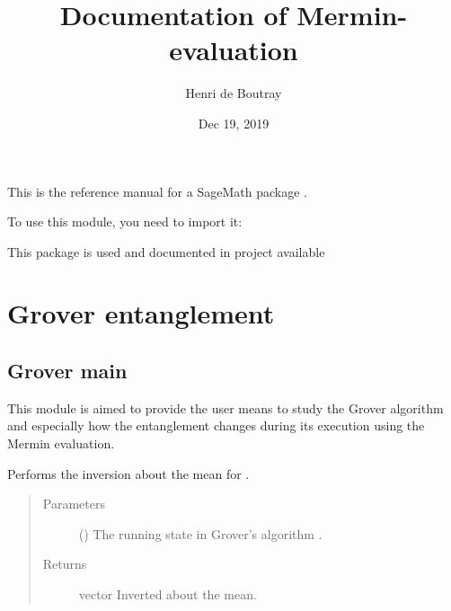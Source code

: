 \documentclass[letterpaper,10pt,english]{sphinxmanual}
\title{Documentation of Mermin-evaluation}
\date{Dec 19, 2019}
\author{Henri de Boutray}
\begin{document}
\maketitle
\sphinxtableofcontents
{}\label{\detokenize{index::doc}}


This is the reference manual for a SageMath package .

To use this module, you need to import it:

%
\begin{sphinxVerbatim}[commandchars=\\\{\},formatcom=\footnotesize]
   
\end{sphinxVerbatim}

This package is used and documented in project available 


\chapter{Grover entanglement}
\label{\detokenize{index:grover-entanglement}}

\section{Grover main}
\label{\detokenize{grover:module-grover}}\label{\detokenize{grover:grover-main}}\label{\detokenize{grover::doc}}
This module is aimed to provide the user means to study the Grover algorithm and
especially how the entanglement changes during its execution using the Mermin 
evaluation.

\begin{fulllineitems}
\label{\detokenize{grover:grover.diffusion_artificial}}
Performs the inversion about the mean for .
\begin{quote}\begin{description}
\item[{Parameters}] \leavevmode
{} () \textendash{} The running state in Grover’s algorithm .

\item[{Returns}] \leavevmode
vector \textendash{}  Inverted about the mean.

\end{description}\end{quote}

\end{fulllineitems}
\end{document}
